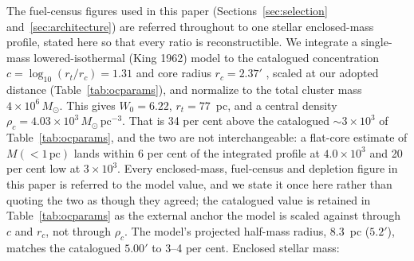 \documentclass[11pt]{article}
\newcommand{\msun}{\ensuremath{M_\odot}}
\begin{document}
The fuel-census figures used in this paper (Sections~\ref{sec:selection}
and~\ref{sec:architecture}) are referred throughout to one stellar
enclosed-mass profile, stated here so that every ratio is reconstructible.
We integrate a single-mass lowered-isothermal (King 1962) model to the
catalogued concentration $c = \log_{10}(r_t/r_c) = 1.31$ and core radius
$r_c = 2.37'$ \citep{Harris1996}, scaled at our adopted distance
(Table~\ref{tab:ocparams}), and normalize to the total cluster mass
$4\times10^{6}\,\msun$. This gives $W_0 = 6.22$, $r_t = 77$~pc, and a
central density $\rho_c = 4.03\times10^{3}\,\msun\,\mathrm{pc}^{-3}$.
That is 34 per cent above the catalogued $\sim$$3\times10^{3}$ of
Table~\ref{tab:ocparams}, and the two are not interchangeable: a flat-core
estimate of $M(<1\,\mathrm{pc})$ lands within 6 per cent of the integrated
profile at $4.0\times10^{3}$ and 20 per cent low at $3\times10^{3}$. Every
enclosed-mass, fuel-census and depletion figure in this paper is referred to
the model value, and we state it once here rather than quoting the two as
though they agreed; the catalogued value is retained in
Table~\ref{tab:ocparams} as the external anchor the model is scaled against
through $c$ and $r_c$, not through $\rho_c$.
The model's projected half-mass radius, $8.3$~pc ($5.2'$), matches the
catalogued $5.00'$ to 3--4 per cent. Enclosed stellar mass:
\end{document}
